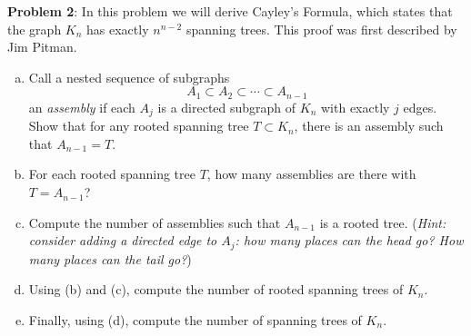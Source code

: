 \documentclass{amsart}
\begin{document}
	\noindent \textbf{Problem 2}: In this problem we will derive Cayley's Formula, which states that the graph $K_n$ has exactly $n^{n-2}$ spanning trees. This proof was first described by Jim Pitman.
	\begin{enumerate}[(a)]
		\item Call a nested sequence of subgraphs 
		$$A_1\subset A_2\subset \cdots \subset A_{n-1}$$
		an \textit{assembly} if each $A_j$ is a directed subgraph of $K_n$ with exactly $j$ edges. Show that for any rooted spanning tree $T\subset K_n$, there is an assembly such that $A_{n-1}=T$.
		\item For each rooted spanning tree $T$, how many assemblies are there with $T=A_{n-1}$?
		\item Compute the number of assemblies such that $A_{n-1}$ is a rooted tree. (\textit{Hint: consider adding a directed edge to $A_j$: how many places can the head go? How many places can the tail go?})
		\item Using (b) and (c), compute the number of rooted spanning trees of $K_n$.
		\item Finally, using (d), compute the number of spanning trees of $K_n$.\\
	\end{enumerate}
	
\end{document}

